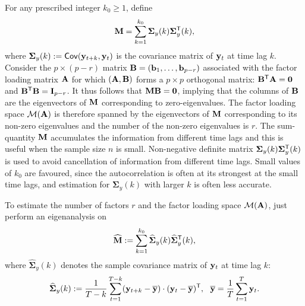 \documentclass{article} %
\begin{document}


For any prescribed integer $k_0\geq 1$, define
\begin{equation}
{\bf M}=\sum_{k=1}^{k_0}{\bm\Sigma}_y(k){\bm\Sigma}^{\sf T}_y(k),
\end{equation}
where ${\bm\Sigma}_y(k):={\sf Cov}({\bf y}_{t+k},{\bf y}_t)$ is the covariance matrix of ${\bf y}_t$ at time lag $k$.
Consider the $p\times(p-r)$ matrix ${\bf B}=({\bf b}_1,\ldots,{\bf b}_{p-r})$ associated with the factor loading matrix $\bf A$ for which $({\bf A},{\bf B})$ forms a $p\times p$ orthogonal matrix: ${\bf B}^{\sf T}{\bf A}={\bf 0}$ and ${\bf B}^{\sf T}{\bf B}={\bf I}_{p-r}$. It thus follows that ${\bf MB=0}$, implying that the columns of $\bf B$ are the eigenvectors of $\bf M$ corresponding to zero-eigenvalues. The factor loading space ${\cal M}({\bf A})$ is therefore spanned by the eigenvectors of $\bf M$ corresponding to its non-zero eigenvalues and the number of the non-zero eigenvalues is $r$. The sum-quantity $\bf M$ accumulates the information from different time lags and this is useful when the sample size $n$ is small. Non-negative definite matrix ${\bf \Sigma}_y(k){\bf\Sigma}^{\sf T}_y(k)$ is used to avoid cancellation of information from different time lags. Small values of $k_0$ are favoured, since the autocorrelation is often at its strongest at the small time lags, and estimation for ${\bm\Sigma}_y(k)$ with larger $k$ is often less accurate.

To estimate the number of factors $r$ and the factor loading space ${\cal M}({\bf A})$, just perform an eigenanalysis on 
\[{\widehat{\bf M}}:=\sum_{k=1}^{k_0}{\widehat{\bm\Sigma}}_y(k){\widehat{\bm\Sigma}}^{\sf T}_y(k),\]
where ${\widehat{\bm\Sigma}}_y(k)$ denotes the sample covariance matrix of ${\bf y}_t$ at time lag $k$:
\[{\widehat{\bm\Sigma}}_y(k):=\frac{1}{T-k}\sum_{t=1}^{T-k}({\bf y}_{t+k}-{\overline{\bf y}})\cdot({\bf y}_{t}-{\overline{\bf y}})^{\sf T},~~{\overline{\bf y}}=\frac{1}{T}\sum_{t=1}^T{\bf y}_t.\] 
\end{document}
